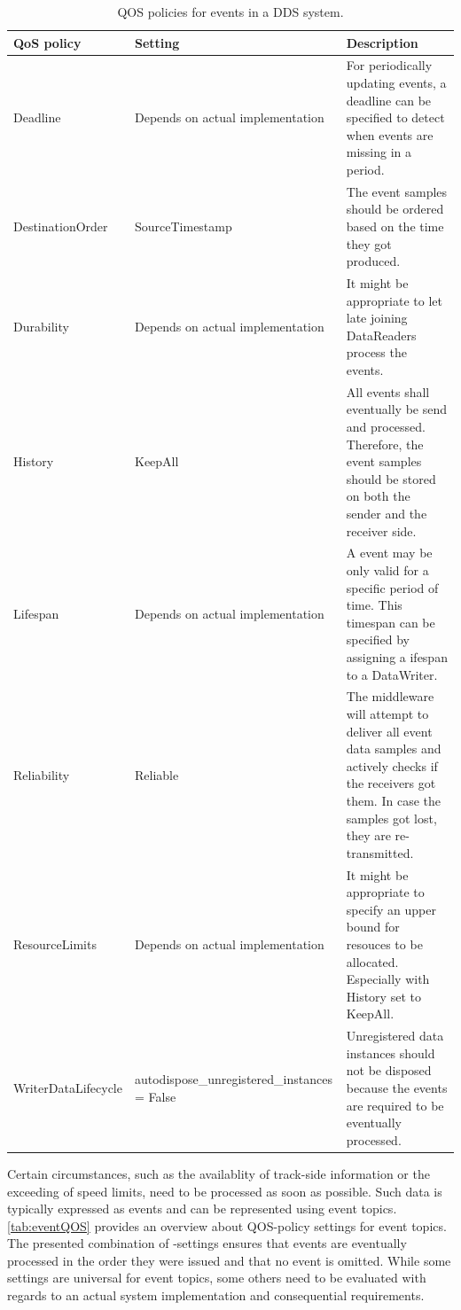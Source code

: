 \begin{table}[h!]
	\begin{center}
		\caption{\Gls*{QOS} policies for events in a \gls*{DDS} system.}
		\label{tab:eventQOS}
		\begin{tabularx}{\textwidth}{|X|X|X|}
			\hline
			\textbf{QoS policy} & \textbf{Setting} & \textbf{Description}\\
			\hline \hline
			Deadline & Depends on actual implementation & For periodically updating events, a deadline can be specified to detect when events are missing in a period. \\
			\hline
			DestinationOrder & SourceTimestamp & The event samples should be ordered based on the time they got produced. \\
			\hline
			Durability & Depends on actual implementation & It might be appropriate to let late joining DataReaders process the events. \\
			\hline
			History & KeepAll & All events shall eventually be send and processed. Therefore, the event samples should be stored on both the sender and the receiver side.  \\
			\hline
			Lifespan & Depends on actual implementation & A event may be only valid for a specific period of time. This timespan can be specified by assigning a ifespan to a DataWriter. \\
			\hline
			Reliability & Reliable & The middleware will attempt to deliver all event data samples and actively checks if the receivers got them. In case the samples got lost, they are re-transmitted. \\
			\hline
			ResourceLimits & Depends on actual implementation & It might be appropriate to specify an upper bound for resouces to be allocated. Especially with History set to KeepAll. \\
			\hline
			WriterDataLifecycle & autodispose\_unregistered\-\_instances = False & Unregistered data instances should not be disposed because the events are required to be eventually processed. \\
			\hline
		\end{tabularx}
	\end{center}
\end{table}

Certain circumstances, such as the availablity of track-side information or the exceeding of speed limits, need to be processed as soon as possible.
Such data is typically expressed as events and can be represented using event topics.
\autoref{tab:eventQOS} provides an overview about \gls*{QOS}-policy settings for event topics.
The presented combination of -settings ensures that events are eventually processed in the order they were issued and that no event is omitted.
While some settings are universal for event topics, some others need to be evaluated with regards to an actual system implementation and consequential requirements.

